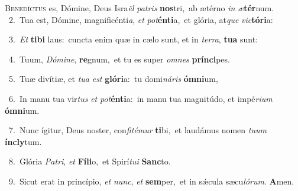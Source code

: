 \lettrine{\initial\textcolor{\initialcolor}{B}}{enedíctus} es, Dómine, Deus Isra\textit{ël} \textit{pa}\-\textit{tris} \textbf{nos}\-tri,~\star ab ætérno \textit{in} \textit{æ}\-\textbf{tér}num.\\
{\numbfont\textcolor{\numbcolor}{~2.}}~Tua est, Dómine, magnificénti\-\textit{a}\-, \textit{et} \textit{pot}\-\textbf{én}\textbf{ti}a,~\star et glória, at\textit{que} \textit{vic}\-\textbf{tó}\textbf{ri}a:\par
{\numbfont\textcolor{\numbcolor}{~3.}}~\textit{Et} \textbf{ti}\-\textbf{bi} laus:~\star cuncta enim quæ in cælo sunt, et in \textit{ter}\-\textit{ra}, \textbf{tu}\-\textbf{a} sunt:\par
{\numbfont\textcolor{\numbcolor}{~4.}}~Tuum, \textit{Dó}\-\textit{mi}\textit{ne}, \textbf{re}\-gnum,~\star et tu es super \textit{om}\-\textit{nes} \textbf{prín}\-\textbf{ci}pes.\par
{\numbfont\textcolor{\numbcolor}{~5.}}~Tuæ divítiæ, et \textit{tu}\-\textit{a} \textit{est} \textbf{gló}\-\textbf{ri}a:~\star tu domi\-\textit{ná}\-\textit{ris} \textbf{óm}\-\textbf{ni}um,\par
{\numbfont\textcolor{\numbcolor}{~6.}}~In manu tua vir\textit{tus} \textit{et} \textit{pot}\-\textbf{én}\textbf{ti}a:~\star in manu tua magnitúdo, et impé\-\textit{ri}\-\textit{um} \textbf{óm}\-\textbf{ni}um.\par
{\numbfont\textcolor{\numbcolor}{~7.}}~Nunc ígitur, Deus noster, con\-\textit{fi}\-\textit{té}\textit{mur} \textbf{ti}\-bi,~\star et laudámus nomen \textit{tu}\-\textit{um} \textbf{ín}\-\textbf{cly}tum.\par
{\numbfont\textcolor{\numbcolor}{~8.}}~Glória \textit{Pa}\-\textit{tri}, \textit{et} \textbf{Fí}\-\textbf{li}o,~\star et Spirí\-\textit{tu}\-\textit{i} \textbf{Sanc}\-to.\par
{\numbfont\textcolor{\numbcolor}{~9.}}~Sicut erat in princípio, \textit{et} \textit{nunc}\-, \textit{et} \textbf{sem}\-per,~\star et in sǽcula sæcu\-\textit{ló}\-\textit{rum}. \textbf{A}\-men.\par
